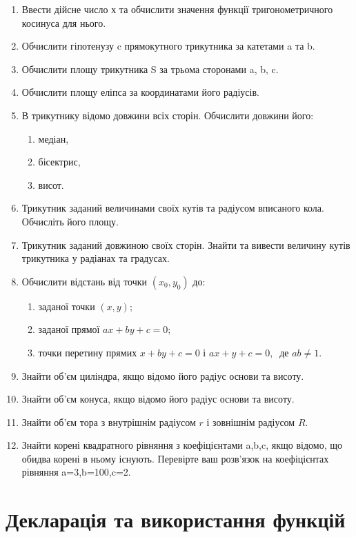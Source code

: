 \documentclass[]{article}
\makeatletter
\newcommand{\xslalph}[1]{\expandafter\@xslalph\csname c@#1\endcsname}
\newcommand{\@xslalph}[1]{%
    \ifcase#1\or а\or б\or в\or г\or д\or e\or є\or ж\or з\or i%
    \or й\or к\or л\or м\or н\or о\or п\or р\or с\or т%
    \or у\or ф\or х\or ц\or ч\or ш\or ю\or я\or аа\or бб\or вв %
    \else\@ctrerr\fi%
}
\makeatother
\begin{document}
\begin{enumerate}
\def\labelenumi{\arabic{enumi}.}
\item
Ввести дійсне число х та обчислити значення функції тригонометричного
косинуса для нього.
\item
Обчислити гіпотенузу c прямокутного трикутника за катетами a та b.
\item
Обчислити площу трикутника S за трьома сторонами a, b, c.
\item
Обчислити площу еліпса за координатами його радіусів.
\item
  В трикутнику відомо довжини всіх сторін. Обчислити довжини його:
  \begin{enumerate}[label=\xslalph*)]
   \item
    медіан,
   \item
    бісектрис,
    \item
    висот.
  \end{enumerate}
\item
Трикутник заданий величинами своїх кутів та радіусом вписаного кола.
Обчисліть його площу.
\item
Трикутник заданий довжиною своїх сторін. Знайти та вивести величину
кутів трикутника у радіанах та градусах.
\item
 Обчислити відстань від точки \((x_{0},y_{0})\) до:
\begin{enumerate}[label=\xslalph*)]
\item заданої точки \((x,y)\);
\item заданої прямої \(ax + by + c = 0\);
\item точки перетину прямих \(x + by + c = 0\) і
\(ax + y + c = 0,\ \) де 
\(ab \neq 1\).
\end{enumerate}

\item
Знайти об'єм циліндра, якщо відомо його радіус основи та висоту.
\item
Знайти об'єм конуса, якщо відомо його радіус основи та висоту.
\item
Знайти об'єм тора з внутрішнім радіусом $r$ і зовнішнім радіусом $R$.
\item
Знайти корені квадратного рівняння з коефіцієнтами a,b,c, якщо відомо,
що обидва корені в ньому існують. Перевірте ваш розв'язок на
коефіцієнтах рівняння a=3,b=100,c=2.
\end{enumerate}

\section{Декларація та використання функцій}
\end{document}
